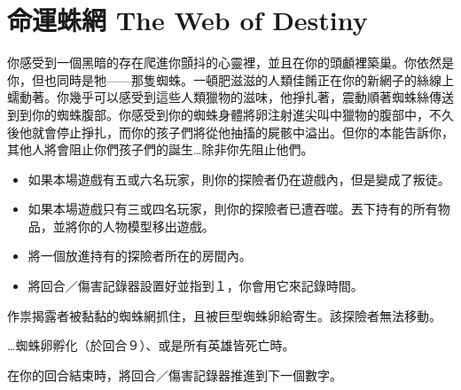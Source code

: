 
\chapter{命運蛛網 The Web of Destiny}

\begin{HauntStory}
	你感受到一個黑暗的存在爬進你顫抖的心靈裡，並且在你的頭顱裡築巢。你依然是你，但也同時是牠——那隻蜘蛛。一頓肥滋滋的人類佳餚正在你的新網子的絲線上蠕動著。你幾乎可以感受到這些人類獵物的滋味，他掙扎著，震動順著蜘蛛絲傳送到到你的蜘蛛腹部。你感受到你的蜘蛛身體將卵注射進尖叫中獵物的腹部中，不久後他就會停止掙扎，而你的孩子們將從他抽搐的屍骸中溢出。但你的本能告訴你，其他人將會阻止你們孩子們的誕生…除非你先阻止他們。
\end{HauntStory}

\vspace*{-1em}
\begin{itemize}
	\item 如果本場遊戲有五或六名玩家，則你的探險者仍在遊戲內，但是變成了叛徒。
	\item 如果本場遊戲只有三或四名玩家，則你的探險者已遭吞噬。丟下持有的所有物品，並將你的人物模型移出遊戲。
	\item 將一個放進持有的探險者所在的房間內。
	\item 將回合／傷害記錄器設置好並指到１，你會用它來記錄時間。
\end{itemize}

作祟揭露者被黏黏的蜘蛛網抓住，且被巨型蜘蛛卵給寄生。該探險者無法移動。

…蜘蛛卵孵化（於回合９）、或是所有英雄皆死亡時。

在你的回合結束時，將回合／傷害記錄器推進到下一個數字。

\vfill\null\pagebreak


